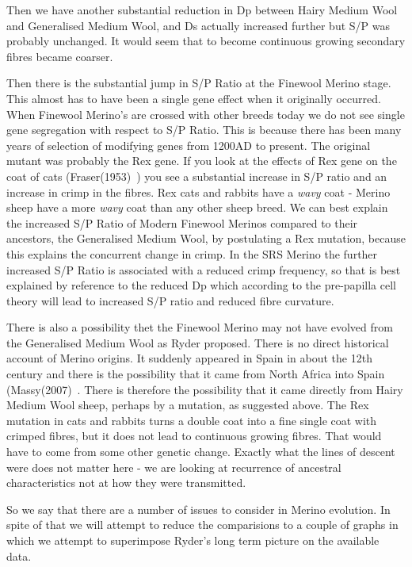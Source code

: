 \documentclass[titlepage]{article}  %
\begin{document}
Then we have another substantial reduction in Dp between Hairy Medium Wool and Generalised Medium Wool, and Ds actually increased further but S/P was probably unchanged. It would seem that to become continuous growing secondary fibres became coarser. 

Then there is the substantial jump in S/P Ratio at the Finewool Merino stage. This almost has to have been a single gene effect when it originally occurred. When Finewool Merino's are crossed with other breeds today we do not see single gene segregation with respect to S/P Ratio. This is because there has been many years of selection of modifying genes from 1200AD to present. The original mutant was probably the Rex gene. If you look at the effects of Rex gene on the coat of cats (Fraser(1953)~\cite{fras:53}) you see a substantial increase in S/P ratio and an increase in crimp in the fibres. Rex cats and rabbits have a {\em wavy} coat - Merino sheep have a more {\em wavy} coat than any other sheep breed. We can best  explain the increased S/P Ratio of Modern Finewool Merinos compared to their ancestors, the Generalised Medium Wool, by postulating a Rex mutation, because this explains the concurrent change in crimp. In the SRS Merino the further increased S/P Ratio is associated with a reduced crimp frequency, so that is best explained by reference to the reduced Dp which according to the pre-papilla cell theory will lead to increased S/P ratio and reduced fibre curvature.

There is also a possibility thet the Finewool Merino may not have evolved from  the Generalised Medium Wool as Ryder proposed. There is no direct historical account of Merino origins. It suddenly appeared in Spain in about the 12th century and there is the possibility that it came from North Africa into Spain (Massy(2007)~\cite{mass:07}. There is therefore the possibility that it came directly from Hairy Medium Wool sheep, perhaps by a mutation, as suggested above. The Rex mutation in cats and rabbits turns a double coat into a fine single coat with crimped fibres, but it does not lead to continuous growing fibres. That would have to come from some other genetic change. Exactly what the lines of descent were does not matter here - we are looking at recurrence of ancestral characteristics not at how they were transmitted.

So we say that there are a number of issues to consider in Merino evolution. In spite of that we will attempt to reduce the comparisions to a couple of graphs in which we attempt to superimpose Ryder's long term picture on the available data. 
\end{document}
